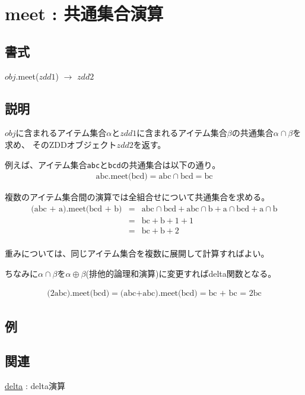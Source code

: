 
\section{meet : 共通集合演算\label{sect:meet}}
\subsection*{書式}
$obj$.meet($zdd1$) $\rightarrow$ $zdd2$

\subsection*{説明}
$obj$に含まれるアイテム集合$\alpha$と$zdd1$に含まれるアイテム集合$\beta$の共通集合$\alpha \cap \beta$を求め、
そのZDDオブジェクト$zdd2$を返す。

例えば、アイテム集合\verb|abc|と\verb|bcd|の共通集合は以下の通り。
\begin{eqnarray*}
\textrm{abc.meet(bcd)} = \textrm{abc} \cap \textrm{bcd} = \textrm{bc}
\end{eqnarray*}

複数のアイテム集合間の演算では全組合せについて共通集合を求める。
\begin{eqnarray*}
\textrm{(abc + a).meet(bcd + b)} &=&
\textrm{abc} \cap \textrm{bcd} + \textrm{abc} \cap \textrm{b} +
\textrm{a} \cap \textrm{bcd} + \textrm{a} \cap \textrm{b}\\
&=& \textrm{bc}  + \textrm{b} + 1 + 1\\
&=& \textrm{bc} + \textrm{b} + 2\\
\end{eqnarray*}

重みについては、同じアイテム集合を複数に展開して計算すればよい。

ちなみに$\alpha \cap \beta$を$\alpha \oplus \beta$(排他的論理和演算)に変更すればdelta関数となる。

\begin{eqnarray*}
\textrm{(2abc).meet(bcd)} = \textrm{(abc+abc).meet(bcd)} = \textrm{bc + bc = 2bc}
\end{eqnarray*}

\subsection*{例}


\subsection*{関連}
\hyperref[sect:delta]{delta} : delta演算
